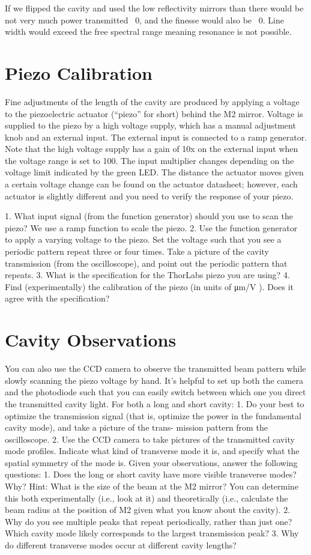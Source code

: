 \documentclass[11pt]{article}
\begin{document}
If we flipped the cavity and used the low reflectivity mirrors than there would be not very much power transmitted ~0, and the finesse would also be ~0. Line width would exceed the free spectral range meaning resonance is not possible. 


\section{Piezo Calibration}
Fine adjustments of the length of the cavity are produced by applying a voltage to the piezoelectric actuator (“piezo” for short) behind the M2 mirror. Voltage is supplied to the piezo by a high voltage supply, which has a manual adjustment knob and an external input. The external input is connected to a ramp generator. Note that the high voltage supply has a gain of 10x on the external input when the voltage range is set to 100. The input multiplier changes depending on the voltage limit indicated by the green LED. The distance the actuator moves given a certain voltage change can be found on the actuator datasheet; however, each actuator is slightly different and you need to verify the response of your piezo.

1. What input signal (from the function generator) should you use to scan the piezo?
We use a ramp function to scale the piezo.
2. Use the function generator to apply a varying voltage to the piezo. Set the voltage such that you see a periodic pattern repeat three or four times. Take a picture of the cavity transmission (from the oscilloscope), and point out the periodic pattern that repeats.
3. What is the specification for the ThorLabs piezo you are using?
4. Find (experimentally) the calibration of the piezo (in units of μm/V ). Does it agree with the specification?

\section{Cavity Observations}

You can also use the CCD camera to observe the transmitted beam pattern while slowly scanning the piezo voltage by hand. It’s helpful to set up both the camera and the photodiode such that you can easily switch between which one you direct the transmitted cavity light. For both a long and short cavity:
1. Do your best to optimize the transmission signal (that is, optimize the power in the fundamental cavity mode), and take a picture of the trans- mission pattern from the oscilloscope.
2. Use the CCD camera to take pictures of the transmitted cavity mode profiles. Indicate what kind of transverse mode it is, and specify what the spatial symmetry of the mode is.
Given your observations, answer the following questions:
1. Does the long or short cavity have more visible transverse modes? Why? Hint: What is the size of the beam at the M2 mirror? You can determine this both experimentally (i.e., look at it) and theoretically (i.e., calculate the beam radius at the position of M2 given what you know about the cavity).
2. Why do you see multiple peaks that repeat periodically, rather than just one? Which cavity mode likely corresponds to the largest transmission peak?
3. Why do different transverse modes occur at different cavity lengths?
\end{document}
